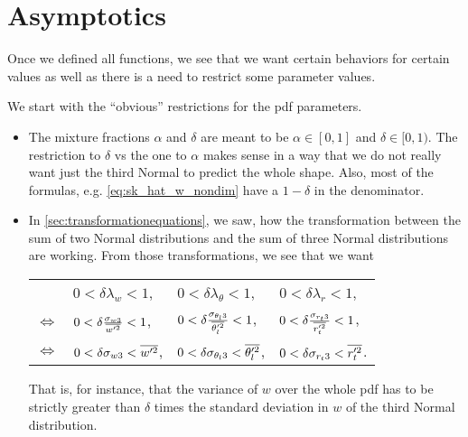 \chapter{Asymptotics}\label{ch:asymptotics}

Once we defined all functions, we see that we want certain behaviors for certain values as well as there is a need to restrict some parameter values.

We start with the \enquote{obvious} restrictions for the \gls{pdf} parameters.
\begin{itemize}
    \item The mixture fractions $\alpha$ and $\delta$ are meant to be $\alpha \in [0,1]$ and $\delta \in [0,1)$.
    The restriction to $\delta$ vs the one to $\alpha$ makes sense in a way that we do not really want just the third Normal to predict the whole shape.
    Also, most of the formulas, e.g. \cref{eq:sk_hat_w_nondim} have a $1-\delta$ in the denominator.

    \item In \cref{sec:transformationequations}, we saw, how the transformation between the sum of two Normal distributions and the sum of three Normal distributions are working.
    From those transformations, we see that we want
    \begin{table}[!ht]
        \centering
        \begin{tabular}{llll}
            &
            $0 < \delta\lambda_w < 1$, &
            $0 < \delta\lambda_\theta < 1$, &
            $0 < \delta\lambda_r < 1$, \\
            $\iff$ &
            $0 < \delta\frac{\sigma_{w3}}{\overline{w'^2}} < 1$, &
            $0 < \delta\frac{\sigma_{\theta_l 3}}{\overline{\theta_l'^2}} < 1$, &
            $0 < \delta\frac{\sigma_{r_t 3}}{\overline{r_t'^2}} < 1$, \\
            $\iff$ &
            $0 < \delta\sigma_{w3} < \overline{w'^2}$, &
            $0 < \delta\sigma_{\theta_l 3} < \overline{\theta_l'^2}$, &
            $0 < \delta\sigma_{r_t 3} < \overline{r_t'^2}$.
        \end{tabular}
        \label{tab:table_asymp_2}
    \end{table}
    That is, for instance, that the variance of $w$ over the whole \gls{pdf} has to be strictly greater than $\delta$ times the standard deviation in $w$ of the third Normal distribution.
\end{itemize}


